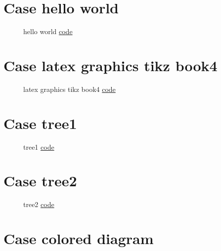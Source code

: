 \documentclass{article}
\begin{document}
\section{Case hello world}

\begin{figure}[H]
    \centering
    
    \caption{hello world \href{https:/github.com/cauliyang/learn_tikz/blob/main/source/hello_world.tex}{code} }
    \label{fig:hello world}
\end{figure}
    
\section{Case latex graphics tikz book4}

\begin{figure}[H]
    \centering
    
    \caption{latex graphics tikz book4 \href{https:/github.com/cauliyang/learn_tikz/blob/main/source/latex_graphics_tikz_book4.tex}{code} }
    \label{fig:latex graphics tikz book4}
\end{figure}
    
\section{Case tree1}

\begin{figure}[H]
    \centering
    
    \caption{tree1 \href{https:/github.com/cauliyang/learn_tikz/blob/main/source/tree1.tex}{code} }
    \label{fig:tree1}
\end{figure}
    
\section{Case tree2}

\begin{figure}[H]
    \centering
    
    \caption{tree2 \href{https:/github.com/cauliyang/learn_tikz/blob/main/source/tree2.tex}{code} }
    \label{fig:tree2}
\end{figure}
    
\section{Case colored diagram}
\end{document}
